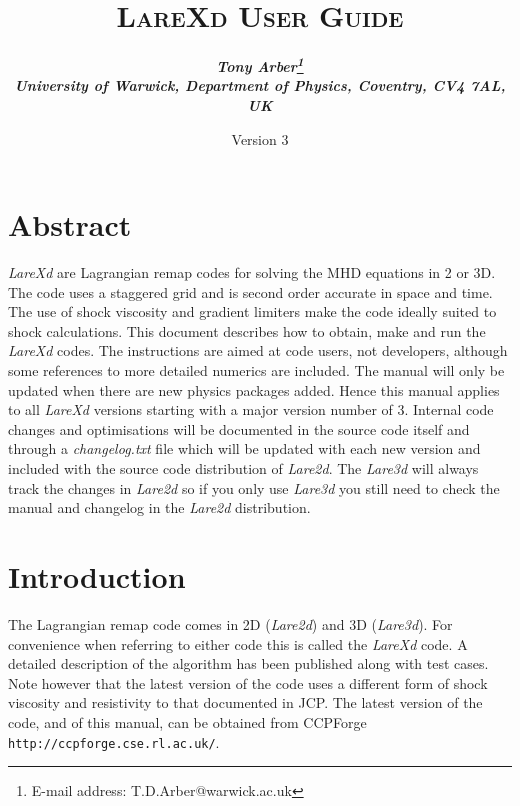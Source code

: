 \documentclass[11pt]{article}
\begin{document}
\title{
\bfseries\scshape LareXd User Guide}
\author{\bfseries\itshape Tony Arber\thanks{E-mail address: T.D.Arber@warwick.ac.uk}\\
University of Warwick, Department of Physics, Coventry, CV4 7AL, UK}
\date{Version 3}
\maketitle

\thispagestyle{empty}

\section*{Abstract}
{\it LareXd} are Lagrangian remap codes for solving the MHD equations in 2 or 3D. The code uses a staggered grid and is second order accurate in space and time. The use of shock viscosity and gradient limiters make the code ideally suited to shock calculations. This document describes how to obtain, make and run the {\it LareXd}  codes. The instructions are aimed at code users, not developers, although some references to more detailed numerics are included. The manual will only be
updated when there are new physics packages added. Hence this manual applies to all {\it LareXd} versions starting with a major version number of 3. Internal code changes and optimisations will be documented in the source code itself and through a {\it changelog.txt} file which will be updated with each new version and included with the source code distribution of {\it Lare2d}. The {\it Lare3d} will always track the changes in {\it Lare2d} so if you only use {\it Lare3d} you still need to check the manual and changelog in the {\it Lare2d} distribution.


\section{Introduction}
The Lagrangian remap code comes in 2D ({\it Lare2d}) and 3D ({\it Lare3d}). For convenience when referring to either code this is called the {\it LareXd} code. A detailed description of the algorithm has been published \cite{jcp} along with test cases. Note however that the latest version of the code uses a different form of shock viscosity and resistivity to that documented in JCP. The latest version of the code, and of this manual, can be obtained from CCPForge {\tt http://ccpforge.cse.rl.ac.uk/}.
\end{document}
